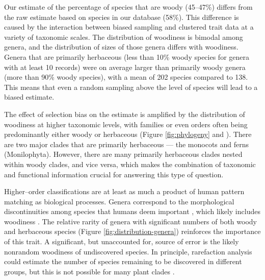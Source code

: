 \documentclass[a4paper,12pt]{article}
\begin{document}
%
Our estimate of the percentage of species that are woody (45--47\%)
differs from the raw estimate based on species in our database (58\%).
This difference is caused by the interaction between biased sampling
and clustered trait data at a variety of taxonomic scales.
%
The distribution of woodiness is bimodal among genera, and the
distribution of sizes of those genera differs with woodiness.  Genera
that are primarily herbaceous (less than 10\% woody species for genera
with at least 10 records) were on average larger than primarily woody
genera (more than 90\% woody species), with a mean of 202 species
compared to 138.  This means that even a random sampling above the
level of species will lead to a biased estimate.

The effect of selection bias on the estimate is amplified by the distribution of woodiness at higher
taxonomic levels, with families or even orders often being
predominantly either woody or herbaceous (Figure \ref{fig:phylogeny} and
\citealt{sinnott1915evolution}).  There are two major clades that are
primarily herbaceous --- the monocots and ferns
(Monilophyta). However, there are many primarily herbaceous clades
nested within woody clades, and vice versa, which makes the
combination of taxonomic and functional information crucial for
answering this type of question.  

Higher--order classifications are at least as much a product of human
pattern matching as biological processes.  Genera correspond to the
morphological discontinuities among species that humans deem important
\citep{scotland2004significance}, which likely includes woodiness
\citep[e.g.,][]{Hutchinson}.  The relative rarity of genera with
significant numbers of both woody and herbaceous species (Figure
\ref{fig:distribution-genera}) reinforces the importance of this
trait.  A significant, but unaccounted for, source of error is the likely
nonrandom woodiness of undiscovered species.  In principle,
rarefaction analysis could estimate the number of species remaining to
be discovered in different groups, but this is not possible for many
plant clades \citep{costello2011}.
\end{document}
